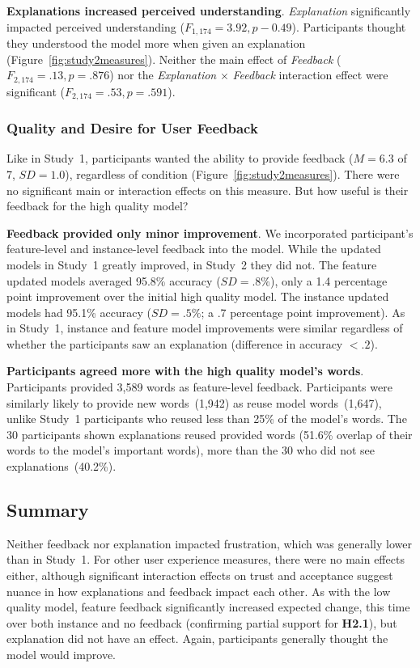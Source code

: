 \textbf{Explanations increased perceived understanding}.
%
\textit{Explanation} significantly impacted perceived understanding ($F_{1,174}=3.92, p-0.49$). Participants thought they understood the model more when given an explanation (Figure~\ref{fig:study2measures}). Neither the main effect of \textit{Feedback} ($F_{2,174}=.13, p=.876$) nor the \textit{Explanation} $\times$ \textit{Feedback} interaction effect were significant ($F_{2,174}=.53, p=.591$).

\subsubsection{Quality and Desire for User Feedback}
Like in Study~1, participants wanted the ability to provide feedback ($M=6.3$ of 7, $SD=1.0$), regardless of condition (Figure~\ref{fig:study2measures}). There were no significant main or interaction effects on this measure. But how useful is their feedback for the high quality model?

\textbf{Feedback provided only minor improvement}.
%
We incorporated participant's feature-level and instance-level feedback into the model.
While the updated models in Study~1 greatly improved, in Study~2 they did not. The feature updated models averaged 95.8\% accuracy ($SD=.8\%$), only a 1.4 percentage point improvement over the initial high quality model.
The instance updated models had 95.1\% accuracy ($SD=.5\%$; a .7 percentage point improvement). As in Study~1, instance and feature model improvements were similar regardless of whether the participants saw an explanation (difference in accuracy $<.2$).

\textbf{Participants agreed more with the high quality model's words}.
%
Participants provided 3,589 words as feature-level feedback. Participants were similarly likely to provide new words~(1,942) as reuse model words~(1,647), unlike Study~1 participants who reused less than 25\% of the model's words. 
The 30 participants shown explanations reused provided words (51.6\% overlap of their words to the model's important words), more than the 30 who did not see explanations~(40.2\%). %

\subsection{Summary}
%
Neither feedback nor explanation impacted frustration, which was generally lower than in Study~1.
For other user experience measures, there were no main effects either, although significant interaction effects on trust and acceptance suggest nuance in how explanations and feedback impact each other.
%
As with the low quality model, feature feedback significantly increased expected change, this time over both instance and no feedback (confirming partial support for \textbf{H2.1}), but explanation did not have an effect. Again, participants generally thought the model would improve. 


